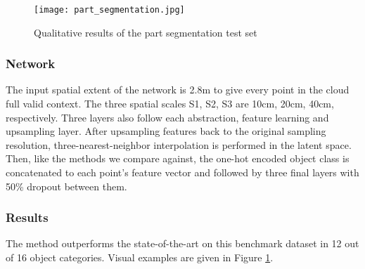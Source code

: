 \documentclass[runningheads]{llncs}
\begin{document}
\begin{figure}[h]
    \centering
  \texttt{[image: part\_segmentation.jpg]} 
    \caption{Qualitative results of the part segmentation test set}
    \label{fig:part_segm_vis} 
\end{figure}

\subsubsection{Network}

The input spatial extent of the network is 2.8m to give every point in the cloud full valid context. The three spatial scales S1, S2, S3 are 10cm, 20cm, 40cm, respectively.  Three  layers also follow each abstraction, feature learning and upsampling layer. After upsampling features back to the original sampling resolution, three-nearest-neighbor interpolation is performed in the latent space. Then, like the methods we compare against, the one-hot encoded object class is concatenated to each point's feature vector and followed by three final  layers with 50\% dropout between them.

\subsubsection{Results}

The method outperforms the state-of-the-art on this benchmark dataset in 12 out of 16 object categories. Visual examples are given in Figure \ref{fig:part_segm_vis}. 
\end{document}
